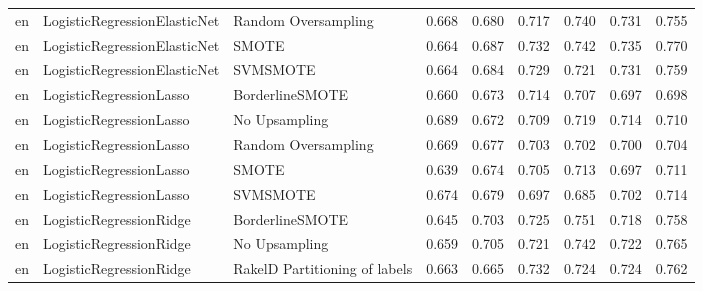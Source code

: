 \begin{tabular}{lllllllll}
      en &    LogisticRegressionElasticNet &           Random Oversampling & 0.668 &                     0.680 &                 0.717 &                  0.740 &                                   0.731 &     0.755 \\
      en &    LogisticRegressionElasticNet &                         SMOTE & 0.664 &                     0.687 &                 0.732 &                  0.742 &                                   0.735 &     0.770 \\
      en &    LogisticRegressionElasticNet &                      SVMSMOTE & 0.664 &                     0.684 &                 0.729 &                  0.721 &                                   0.731 &     0.759 \\
      en &         LogisticRegressionLasso &               BorderlineSMOTE & 0.660 &                     0.673 &                 0.714 &                  0.707 &                                   0.697 &     0.698 \\
      en &         LogisticRegressionLasso &                 No Upsampling & 0.689 &                     0.672 &                 0.709 &                  0.719 &                                   0.714 &     0.710 \\
      en &         LogisticRegressionLasso &           Random Oversampling & 0.669 &                     0.677 &                 0.703 &                  0.702 &                                   0.700 &     0.704 \\
      en &         LogisticRegressionLasso &                         SMOTE & 0.639 &                     0.674 &                 0.705 &                  0.713 &                                   0.697 &     0.711 \\
      en &         LogisticRegressionLasso &                      SVMSMOTE & 0.674 &                     0.679 &                 0.697 &                  0.685 &                                   0.702 &     0.714 \\
      en &         LogisticRegressionRidge &               BorderlineSMOTE & 0.645 &                     0.703 &                 0.725 &                  0.751 &                                   0.718 &     0.758 \\
      en &         LogisticRegressionRidge &                 No Upsampling & 0.659 &                     0.705 &                 0.721 &                  0.742 &                                   0.722 &     0.765 \\
      en &         LogisticRegressionRidge & RakelD Partitioning of labels & 0.663 &                     0.665 &                 0.732 &                  0.724 &                                   0.724 &     0.762 \\

\end{tabular}
